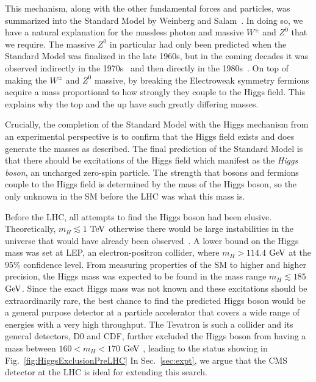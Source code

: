 
This mechanism, along with the other fundamental forces and particles, was summarized into the Standard Model by Weinberg and Salam~\cite{Weinberg:1967tq,Salam:1968}. In doing so, we have a natural explanation for the massless photon and massive $W^{\pm}$ and $Z^{0}$ that we require. The massive $Z^{0}$ in particular had only been predicted when the Standard Model was finalized in the late 1960s, but in the coming decades it was observed indirectly in the 1970s~\cite{Hasert:1973ff} and then directly in the 1980s~\cite{Arnison:1983rp,Arnison:1983mk,Bagnaia:1983zx}. On top of making the $W^{\pm}$ and $Z^{0}$ massive, by breaking the Electroweak symmetry fermions acquire a mass proportional to how strongly they couple to the Higgs field. This explains why the top and the up have such greatly differing masses.

Crucially, the completion of the Standard Model with the Higgs mechanism from an experimental perspective is to confirm that the Higgs field exists and does generate the masses as described. The final prediction of the Standard Model is that there should be excitations of the Higgs field which manifest as the \textit{Higgs boson}, an uncharged zero-spin particle. The strength that bosons and fermions couple to the Higgs field is determined by the mass of the Higgs boson, so the only unknown in the SM before the LHC was what this mass is.

Before the LHC, all attempts to find the Higgs boson had been elusive. Theoretically, $m_{H}\lesssim1$ $\rm{TeV}$ otherwise there would be large instabilities in the universe that would have already been observed~\cite{Sher:1989}. A lower bound on the Higgs mass was set at LEP, an electron-positron collider, where $m_{H}>114.4$ $\rm{GeV}$ \cite{Barate:2003sz} at the 95\% confidence level. From measuring properties of the SM to higher and higher precision, the Higgs mass was expected to be found in the mass range $m_{H}\lesssim185$ $\rm{GeV}$. Since the exact Higgs mass was not known and these excitations should be extraordinarily rare, the best chance to find the predicted Higgs boson would be a general purpose detector at a particle accelerator that covers a wide range of energies with a very high throughput. The Tevatron is such a collider and its general detectors, D0 and CDF, further excluded the Higgs boson from having a mass between $160<m_{H}<170$ $\rm{GeV}$ \cite{CDFandD0:2011aa}, leading to the status showing in Fig.~\ref{fig:HiggsExclusionPreLHC} In Sec.~\ref{sec:expt}, we argue that the CMS detector at the LHC is ideal for extending this search.

